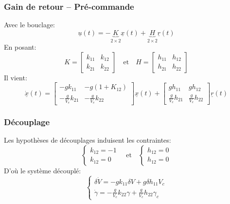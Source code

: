 \documentclass[footheight=2em]{beamer}
\begin{document}
\begin{frame}
    \frametitle{Gain de retour -- Pré-commande} \pause{}
    Avec le bouclage:
    \[
    \underline{u}(t) = -\underbrace{K}_{2 \times 2} \underline{x}(t) +
        \underbrace{H}_{2 \times 2} \underline{r}(t)
    \] \pause{}
    En posant:
    \[
    K =
    \left[
    \begin{array}{cc}
        k_{11} & k_{12} \\
        k_{21} & k_{22}
    \end{array}
    \right]\quad
    \text{et}\quad
    H =
    \left[
    \begin{array}{cc}
        h_{11} & h_{12} \\
        h_{21} & h_{22}
    \end{array}
    \right]
    \] \pause{}
    Il vient:
    \[
    \underline{\dot{x}}(t)
    =
    \left[
    \begin{array}{cc}
        -g k_{11} & -g (1+K_{12}) \\
        -\frac{g}{V_e} k_{21} & -\frac{g}{V_e} k_{22}
    \end{array}
    \right]
    \underline{x} (t)
    +
    \left[
    \begin{array}{cc}
        g h_{11} & g h_{12} \\
        \frac{g}{V_e} h_{21} & \frac{g}{V_e} h_{22}
    \end{array}
    \right]
    \underline{r} (t)
    \]
\end{frame}


\begin{frame}
    \frametitle{Découplage} \pause{}
    Les hypothèses de découplages induisent les contraintes:
    \[
    \left \{
    \begin{array}{l}
        k_{12} = -1 \\
        k_{12} = 0
    \end{array}
    \right.\quad
    \text{et}\quad
    \left \{
    \begin{array}{l}
        h_{12} = 0 \\
        h_{12} = 0
    \end{array}
    \right.
    \]
    \pause{}
    D'où le système découplé:
    \[
    \left \{
    \begin{array}{l}
        \delta \dot{V} = -g k_{11} \delta V + g \delta h_{11} V_c \\
        \dot{\gamma} = -\frac{g}{V_e} k_{22} \gamma + \frac{g}{V_e} h_{22} \gamma_c
    \end{array}
    \right.
    \]
\end{frame}
\end{document}

